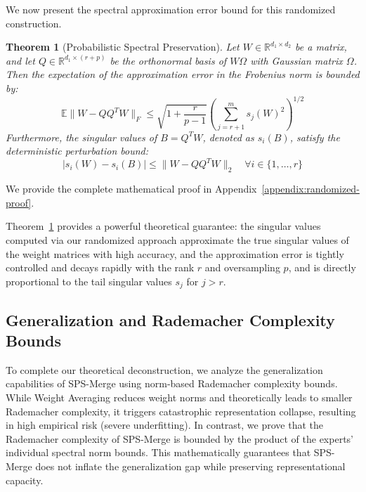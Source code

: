 \documentclass{article}
\theoremstyle{plain}
\newtheorem{theorem}{Theorem}[section]
\theoremstyle{definition}
\theoremstyle{remark}
\begin{document}
We now present the spectral approximation error bound for this randomized construction.

\begin{theorem}[Probabilistic Spectral Preservation]
\label{thm:randomized-svd}
Let $W \in \mathbb{R}^{d_1 \times d_2}$ be a matrix, and let $Q \in \mathbb{R}^{d_1 \times (r+p)}$ be the orthonormal basis of $W \Omega$ with Gaussian matrix $\Omega$. Then the expectation of the approximation error in the Frobenius norm is bounded by:
\begin{equation}
    \mathbb{E} \|W - Q Q^T W\|_F \le \sqrt{1 + \frac{r}{p - 1}} \left(\sum_{j=r+1}^m s_j(W)^2\right)^{1/2}
\end{equation}
Furthermore, the singular values of $B = Q^T W$, denoted as $s_i(B)$, satisfy the deterministic perturbation bound:
\begin{equation}
    |s_i(W) - s_i(B)| \le \|W - Q Q^T W\|_2 \quad \forall i \in \{1, \dots, r\}
\end{equation}
\end{theorem}

We provide the complete mathematical proof in Appendix~\ref{appendix:randomized-proof}.

Theorem~\ref{thm:randomized-svd} provides a powerful theoretical guarantee: the singular values computed via our randomized approach approximate the true singular values of the weight matrices with high accuracy, and the approximation error is tightly controlled and decays rapidly with the rank $r$ and oversampling $p$, and is directly proportional to the tail singular values $s_j$ for $j > r$.

\subsection{Generalization and Rademacher Complexity Bounds}
To complete our theoretical deconstruction, we analyze the generalization capabilities of SPS-Merge using norm-based Rademacher complexity bounds. While Weight Averaging reduces weight norms and theoretically leads to smaller Rademacher complexity, it triggers catastrophic representation collapse, resulting in high empirical risk (severe underfitting). In contrast, we prove that the Rademacher complexity of SPS-Merge is bounded by the product of the experts' individual spectral norm bounds. This mathematically guarantees that SPS-Merge does not inflate the generalization gap while preserving representational capacity.
\end{document}
